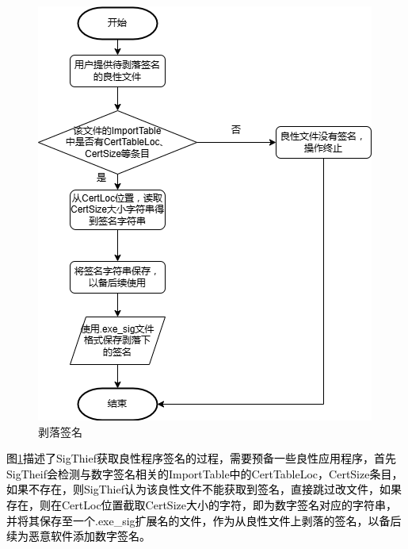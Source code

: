 \begin{figure}
  \centering
  \includegraphics[]{images/peel_signature.png}
  \caption{剥落签名}\label{fig:peel_signature}
\end{figure}
\textcolor{black}{图\ref{fig:peel_signature}描述了SigThief获取良性程序签名的过程，需要预备一些良性应用程序，首先SigTheif会检测与数字签名相关的ImportTable中的CertTableLoc，CertSize条目，如果不存在，则SigThief认为该良性文件不能获取到签名，直接跳过改文件，如果存在，则在CertLoc位置截取CertSize大小的字符，即为数字签名对应的字符串，并将其保存至一个.exe\_sig扩展名的文件，作为从良性文件上剥落的签名，以备后续为恶意软件添加数字签名。}

